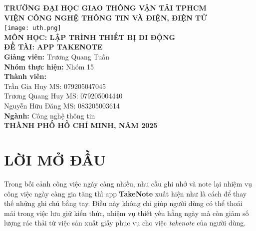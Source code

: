 \documentclass[a4paper,12pt]{article}
\begin{document}
\begin{center}

\begin{tcolorbox}
\begin{center}
\textbf{TRƯỜNG ĐẠI HỌC GIAO THÔNG VẬN TẢI TPHCM} \\[1.2em]

\textbf{VIỆN CÔNG NGHỆ THÔNG TIN VÀ ĐIỆN, ĐIỆN TỬ} \\[2em]

\texttt{[image: uth.png]} \\[2em]

\textbf{MÔN HỌC: LẬP TRÌNH THIẾT BỊ DI ĐỘNG} \\[1.5em]

\textbf{ĐỀ TÀI: APP TAKENOTE} \\[1.5em]

\textbf{Giảng viên:} Trương Quang Tuấn \\[1.2em]

\textbf{Nhóm thực hiện:} Nhóm 15 \\[1.2em]

\textbf{Thành viên:} \\[1.2em]

Trần Gia Huy \hfill MS: 079205047045 \\[0.8em]

Trương Quang Huy \hfill MS: 079205004440 \\[0.8em]

Nguyễn Hữu Đăng \hfill MS: 083205003614 \\[1.5em]

\textbf{Ngành:} Công nghệ thông tin \\[2em]

\textbf{THÀNH PHỐ HỒ CHÍ MINH, NĂM 2025}
\end{center}
\end{tcolorbox}
\end{center}

\clearpage

\tableofcontents

\clearpage

\section{LỜI MỞ ĐẦU}
Trong bối cảnh công việc ngày càng nhiều, nhu cầu ghi nhớ và note lại nhiệm vụ công việc ngày càng gia tăng thì app \textbf{TakeNote} xuất hiện như là cách để thay thế những ghi chú bằng tay. Điều này không chỉ giúp người dùng có thể thoải mái trong việc lưu giữ kiến thức, nhiệm vụ thiết yếu hằng ngày mà còn giảm số lượng rác thải từ việc sản xuất giấy phục vụ cho việc \textit{takenote} của người dùng.
\end{document}
